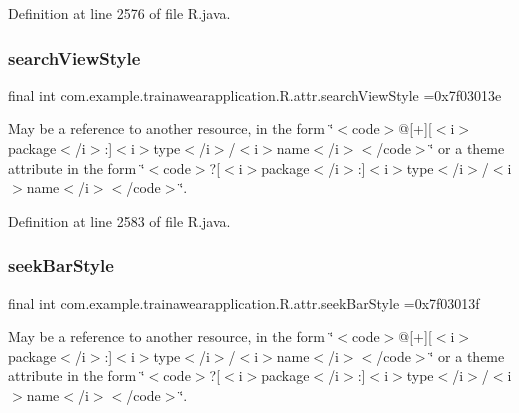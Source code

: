 Definition at line 2576 of file R.\+java.

\mbox{\label{classcom_1_1example_1_1trainawearapplication_1_1_r_1_1attr_a7a35c4fd6a280fc487a25c92428d07b3}} 
\subsubsection{\texorpdfstring{searchViewStyle}{searchViewStyle}}
{\footnotesize\ttfamily final int com.\+example.\+trainawearapplication.\+R.\+attr.\+search\+View\+Style =0x7f03013e\hspace{0.3cm}{\ttfamily [static]}}

May be a reference to another resource, in the form \char`\"{}$<$code$>$@\mbox{[}+\mbox{]}\mbox{[}$<$i$>$package$<$/i$>$\+:\mbox{]}$<$i$>$type$<$/i$>$/$<$i$>$name$<$/i$>$$<$/code$>$\char`\"{} or a theme attribute in the form \char`\"{}$<$code$>$?\mbox{[}$<$i$>$package$<$/i$>$\+:\mbox{]}$<$i$>$type$<$/i$>$/$<$i$>$name$<$/i$>$$<$/code$>$\char`\"{}. 

Definition at line 2583 of file R.\+java.

\mbox{\label{classcom_1_1example_1_1trainawearapplication_1_1_r_1_1attr_a76c1deb517935519b4e3563a87403b56}} 
\subsubsection{\texorpdfstring{seekBarStyle}{seekBarStyle}}
{\footnotesize\ttfamily final int com.\+example.\+trainawearapplication.\+R.\+attr.\+seek\+Bar\+Style =0x7f03013f\hspace{0.3cm}{\ttfamily [static]}}

May be a reference to another resource, in the form \char`\"{}$<$code$>$@\mbox{[}+\mbox{]}\mbox{[}$<$i$>$package$<$/i$>$\+:\mbox{]}$<$i$>$type$<$/i$>$/$<$i$>$name$<$/i$>$$<$/code$>$\char`\"{} or a theme attribute in the form \char`\"{}$<$code$>$?\mbox{[}$<$i$>$package$<$/i$>$\+:\mbox{]}$<$i$>$type$<$/i$>$/$<$i$>$name$<$/i$>$$<$/code$>$\char`\"{}. 

